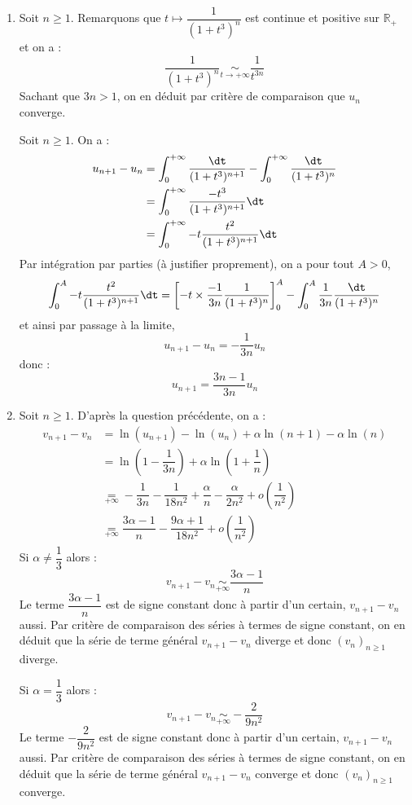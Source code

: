 \documentclass[a4paper,10pt]{report}
\begin{document}
\corr \begin{enumerate}
\item Soit $n \geq 1$. Remarquons que $t \mapsto \dfrac{1}{(1+t^3)^n}$ est continue et positive sur $\mathbb{R}_+$ et on a :
$$ \dfrac{1}{(1+t^3)^n} \underset{t \rightarrow + \infty}{\sim} \dfrac{1}{t^{3n}}$$
Sachant que $3n>1$, on en déduit par critère de comparaison que $u_n$ converge.

\medskip

\noindent Soit $n \geq 1$. On a :
\begin{align*}
 u_{n+1} - u_n &  =  \int_{0}^{+ \infty} \dfrac{\dt}{(1+t^3)^{n+1}} -  \int_{0}^{+ \infty} \dfrac{\dt}{(1+t^3)^n} \\
 & = \int_{0}^{+ \infty} \dfrac{-t^3}{(1+t^3)^{n+1}} \dt \\
 & =  \int_{0}^{+ \infty} - t \dfrac{t^2}{(1+t^3)^{n+1}} \dt
\end{align*}
Par intégration par parties (à justifier proprement), on a pour tout $A>0$,
$$ \int_{0}^A  - t \dfrac{t^2}{(1+t^3)^{n+1}} \dt = \left[-t \times \dfrac{-1}{3n} \dfrac{1}{(1+t^3)^n} \right]_0^A -\int_{0}^A \dfrac{1}{3n} \dfrac{\dt}{(1+t^3)^n}$$
et ainsi par passage à la limite,
$$ u_{n+1}-u_n = -\dfrac{1}{3n} u_n$$
donc :
$$ u_{n+1} = \dfrac{3n-1}{3n} u_n$$

\item Soit $n \geq 1$. D'après la question précédente, on a :
\begin{align*}
v_{n+1}-v_n & = \ln(u_{n+1})- \ln(u_n) + \alpha \ln(n+1)- \alpha \ln(n) \\
& = \ln \left(1 - \dfrac{1}{3n} \right) + \alpha \ln \left(1 + \dfrac{1}{n} \right) \\
& \underset{+ \infty}{=} - \dfrac{1}{3n} - \dfrac{1}{18n^2} + \dfrac{\alpha}{n}- \dfrac{\alpha}{2n^2} + o \left( \dfrac{1}{n^2} \right) \\
& \underset{+ \infty}{=} \dfrac{3 \alpha-1}{n} - \dfrac{9\alpha+1}{18n^2}+ o \left( \dfrac{1}{n^2}\right)
\end{align*}
Si $\alpha \neq \dfrac{1}{3}$ alors :
$$ v_{n+1}-v_n \underset{+ \infty}{\sim} \dfrac{3 \alpha-1}{n}$$
Le terme $\dfrac{3 \alpha-1}{n}$ est de signe constant donc à partir d'un certain, $v_{n+1}-v_n$ aussi. Par critère de comparaison des séries à termes de signe constant, on en déduit que la série de terme général $v_{n+1}-v_n$ diverge et donc $(v_n)_{n \geq 1}$ diverge. 

\medskip

\noindent Si $\alpha = \dfrac{1}{3}$ alors :
$$ v_{n+1}-v_n \underset{+ \infty}{\sim} - \dfrac{2}{9n^2} $$
Le terme $-\dfrac{2}{9n^2}$ est de signe constant donc à partir d'un certain, $v_{n+1}-v_n$ aussi. Par critère de comparaison des séries à termes de signe constant, on en déduit que la série de terme général $v_{n+1}-v_n$ converge et donc $(v_n)_{n \geq 1}$ converge. 


\end{enumerate}
\end{document}
